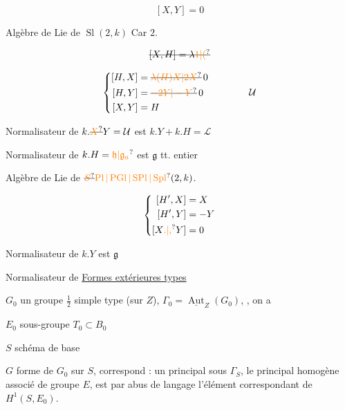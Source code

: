 
\[
[X,Y]=0
\]

Algèbre de Lie de \(\operatorname{Sl}(2,k)\) \hfill Car \(2\).

\[
\deleted{[X,H]=\lambda\unsure{1|(}}
\]

\[
\left\{\begin{aligned}
[H,X]&=\deleted{\unsure{\lambda(H)X|2X}}\,0\\
[H,Y]&=\deleted{\unsure{-2Y|-Y}}\,0\\
[X,Y]&=H
\end{aligned}\right.\qquad\qquad \mathcal U
\]

Normalisateur de \(k.\deleted{\unsure{X}}Y=\mathcal U\) est \(k.Y+k.H=\mathscr L\)

Normalisateur de \(k.H=\unsure{\mathfrak h|\mathfrak g_a}\) est \(\mathfrak g\) tt. entier

Algèbre de Lie de \(\deleted{\unsure{S}}\unsure{\operatorname{Pl}|\operatorname{PGl}|\operatorname{SPl}|\operatorname{Spl}}(2,k)\).

\[
\left\{\begin{aligned}
[H',X]&=X\\
[H',Y]&=-Y\\
[X\unsure{.|,}Y]&=0
\end{aligned}\right.
\]

Normalisateur de \(k.Y\) est \(\mathfrak g\)

Normalisateur de
\uline{Formes extérieures types}


\(G_0\) un groupe \(\tfrac12\) simple type (sur \(Z\)), \(\Gamma_0=\underline{\operatorname{Aut}}_Z(G_0)\), , on a 

\(E_0\) sous-groupe  \(T_0\subset B_0\)

\(S\) schéma de base

\(G\) forme de \(G_0\) sur \(S\), correspond : un principal   sous \(\Gamma_S\),   le principal homogène associé de groupe \(E\),  est  par abus de langage l'élément correspondant de \(H^1(S,E_0)\).

